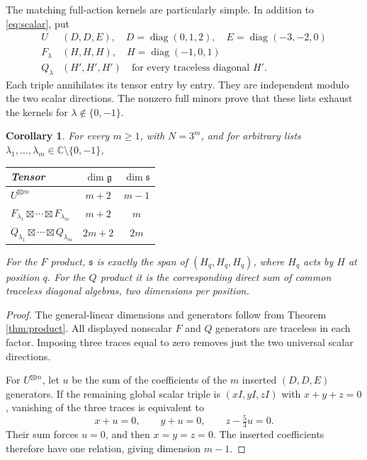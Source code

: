 \documentclass[11pt]{article}
\newtheorem{corollary}[theorem]{Corollary}
\theoremstyle{remark}\newtheorem{remark}[theorem]{Remark}
\newcommand{\C}{\mathbb C}
\newcommand{\diag}{\operatorname{diag}}
\newcommand{\gp}{\boxtimes}
\newcommand{\g}{\mathfrak g}
\newcommand{\s}{\mathfrak s}
\begin{document}
The matching full-action kernels are particularly simple. In addition to \eqref{eq:scalar}, put
\begin{equation}\label{eq:localgens}
 \begin{array}{c|c}
 U&(D,D,E),\quad D=\diag(0,1,2),\quad E=\diag(-3,-2,0)\\[2pt]
 F_\lambda&(H,H,H),\quad H=\diag(-1,0,1)\\[2pt]
 Q_\lambda&(H',H',H')\quad\text{for every traceless diagonal }H'.
 \end{array}
\end{equation}
Each triple annihilates its tensor entry by entry. They are independent modulo the two scalar directions. The nonzero full minors prove that these lists exhaust the kernels for $\lambda\notin\{0,-1\}$.

\begin{corollary}\label{cor:stabs}
For every $m\geq1$, with $N=3^m$, and for arbitrary lists $\lambda_1,\ldots,\lambda_m\in\C\setminus\{0,-1\}$,
\begin{center}
\begin{tabular}{lcc}
\toprule
Tensor & $\dim\g$ & $\dim\s$\\
\midrule
$U^{\gp m}$ & $m+2$ & $m-1$\\
$F_{\lambda_1}\gp\cdots\gp F_{\lambda_m}$ & $m+2$ & $m$\\
$Q_{\lambda_1}\gp\cdots\gp Q_{\lambda_m}$ & $2m+2$ & $2m$\\
\bottomrule
\end{tabular}
\end{center}
For the $F$ product, $\s$ is exactly the span of $(H_q,H_q,H_q)$, where $H_q$ acts by $H$ at position $q$. For the $Q$ product it is the corresponding direct sum of common traceless diagonal algebras, two dimensions per position.
\end{corollary}
\begin{proof}
The general-linear dimensions and generators follow from Theorem \ref{thm:product}. All displayed nonscalar $F$ and $Q$ generators are traceless in each factor. Imposing three traces equal to zero removes just the two universal scalar directions.

For $U^{\gp m}$, let $u$ be the sum of the coefficients of the $m$ inserted $(D,D,E)$ generators. If the remaining global scalar triple is $(xI,yI,zI)$ with $x+y+z=0$, vanishing of the three traces is equivalent to
\[
 x+u=0,\qquad y+u=0,\qquad z-\tfrac53u=0.
\]
Their sum forces $u=0$, and then $x=y=z=0$. The inserted coefficients therefore have one relation, giving dimension $m-1$.
\end{proof}
\end{document}
